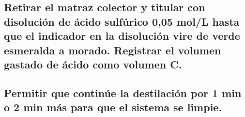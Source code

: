 \documentclass[spanish,12pt,letterpaper,titlepage]{article}
\theoremstyle{definition}
\begin{document}
	\subsection{Retirar el matraz colector y titular con disolución de ácido sulfúrico 0,05 mol/L hasta que el indicador en la disolución vire de verde esmeralda a morado. Registrar el volumen gastado de ácido como volumen C.}\label{A.4.4.4}
	\subsection{Permitir que continúe la destilación por 1 min o 2 min más para que el sistema se limpie.}\label{A.4.4.5}
\end{document}

